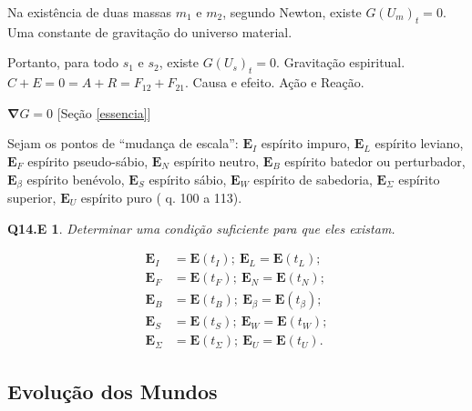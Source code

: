 \documentclass[12pt,a4paper]{article}
\begin{document}
			Na exist\^encia de duas massas $m_1$ e $m_2$, segundo Newton, existe $G(U_m)_t = 0$. Uma constante de gravita\c{c}\~ao do universo material.

			Portanto, para todo $s_1$ e $s_2$, existe $G(U_s)_t = 0$. Gravita\c{c}\~ao espiritual. $C + E = 0 = A + R = F_{12} + F_{21}$. Causa e efeito. A\c{c}\~ao e Rea\c{c}\~ao.

			$\mathbf{\nabla} G = 0$	[Se\c{c}\~ao \ref{essencia}]

			\begin{flushright}
			\end{flushright}

			Sejam os pontos de \textquotedblleft mudan\c{c}a de escala\textquotedblright: $ \mathbf{E}_I $ esp\'irito impuro, $ \mathbf{E}_L $ esp\'irito leviano, $ \mathbf{E}_F $ esp\'irito pseudo-s\'abio, $ \mathbf{E}_N $ esp\'irito neutro, $ \mathbf{E}_B $ esp\'irito batedor ou perturbador, $ \mathbf{E}_\beta $ esp\'irito ben\'evolo, $ \mathbf{E}_S $ esp\'irito s\'abio, $ \mathbf{E}_W $ esp\'irito de sabedoria, $ \mathbf{E}_\Sigma $ esp\'irito superior, $ \mathbf{E}_U $ esp\'irito puro (\cite{le} q. 100 a 113).

			\newtheorem{Q14.E}{Q14.E}
			\begin{Q14.E} Determinar uma condi\c{c}\~ao suficiente para que eles existam.
			\end{Q14.E}

			\begin{align*}
				\mathbf{E}_I &= \mathbf{E}\left(t_I\right); \
				\mathbf{E}_L = \mathbf{E}\left(t_L\right); \\
				\mathbf{E}_F &= \mathbf{E}\left(t_F\right); \
				\mathbf{E}_N = \mathbf{E}\left(t_N\right); \\
				\mathbf{E}_B &= \mathbf{E}\left(t_B\right); \
				\mathbf{E}_\beta = \mathbf{E}\left(t_\beta\right); \\
				\mathbf{E}_S &= \mathbf{E}\left(t_S\right); \
				\mathbf{E}_W = \mathbf{E}\left(t_W\right); \\
				\mathbf{E}_\Sigma &= \mathbf{E}\left(t_\Sigma\right); \
				\mathbf{E}_U = \mathbf{E}\left(t_U\right).
			\end{align*}

		\subsection {Evolu\c{c}\~ao dos Mundos}
			\begin{flushright}
			\end{flushright}
\end{document}
